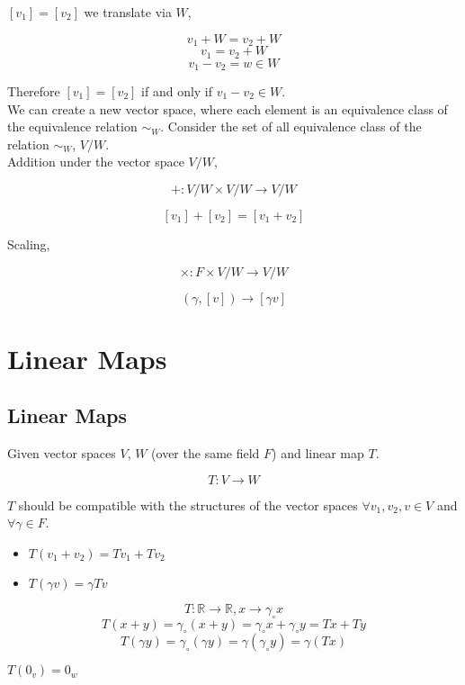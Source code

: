 \documentclass[11pt,a4paper]{colorart}
\def\l{\left}
\def\r{\right}
\def\R{\mathbb{R}}
\def\g{\gamma}
\begin{document}
$\l[v_1\r] = \l[v_2\r]$ we translate via $W$,

\[ v_1+W = v_2+W \] 
\[ v_1 = v_2 + W\]
\[ v_1 -v_2 = w\in W\]

Therefore $\l[v_1\r] =\l[v_2\r]$ if and only if $ v_1 -v_2 \in W$.\\

We can create a new vector space, where each element is an equivalence class of the equivalence relation $\sim_W$. Consider the set of all equivalence class of the relation $\sim_W$, $V/W$.\\

Addition under the vector space $V/W$,

\[ +: V/W \times V/W \rightarrow V/W \]

\[ \l[v_1\r] + \l[v_2\r] = \l[v_1+v_2\r]  \]

Scaling,

\[ \times : F \times V/W \rightarrow V/W \]

\[ \l(\g,\l[v\r]\r) \rightarrow \l[\g v\r] \]

\section{Linear Maps}

\subsection{Linear Maps}

Given vector spaces $V$, $W$ (over the same field $F$) and linear map $T$.

\[ T: V \rightarrow W \]

$T$ should be compatible with the structures of the vector spaces $\forall v_1,v_2,v\in V$ and $\forall \g \in F$.

\begin{itemize}
	\item $T\l(v_1+v_2\r)=Tv_1+Tv_2$
	\item $T\l(\g v\r)=\g Tv$
\end{itemize}

\begin{example}
	\[ T:\R\rightarrow\R,x\rightarrow\g_\circ x\]
	\[ T\l(x+y\r) = \g_\circ\l(x+y\r) = \g_\circ x + \g_\circ y = Tx + Ty \]
	\[ T\l(\g y\r)= \g_\circ\l(\g y\r)= \g\l(\g_\circ y\r)=\g\l(Tx\r) \]
\end{example}

\begin{remark}
	$T\l(0_v\r) = 0_w$
\end{remark}
\end{document}
